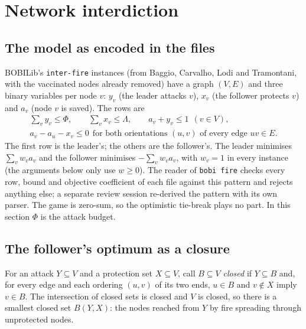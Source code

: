 \section{Network interdiction}\label{app:network}

\subsection{The model as encoded in the files}

BOBILib's \texttt{inter-fire} instances (from Baggio, Carvalho, Lodi and
Tramontani,\cite{baggio2021multilevel} with the vaccinated nodes already removed) have a graph
$(V,E)$ and three binary variables per node $v$: $y_v$ (the leader attacks
$v$), $x_v$ (the follower protects $v$) and $a_v$ (node $v$ is saved). The rows
are
\begin{gather*}
  \sum_vy_v\le\Phi,\qquad
  \sum_vx_v\le\Lambda,\qquad
  a_v+y_v\le 1\ \ (v\in V),\\
  a_v-a_u-x_v\le 0\ \ \text{for both orientations }(u,v)\text{ of every edge }uv\in E.
\end{gather*}
The first row is the leader's; the others are the follower's. The leader
minimises $\sum_vw_va_v$ and the follower minimises $-\sum_vw_va_v$, with
$w_v=1$ in every instance (the arguments below only use $w\ge 0$). The reader of
\texttt{bobi fire} checks every row, bound and objective coefficient of each file against this
pattern and rejects anything else; a separate review session re-derived the
pattern with its own parser. The game is zero-sum, so the optimistic
tie-break plays no part. In this section $\Phi$ is the attack budget.

\subsection{The follower's optimum as a closure}

For an attack $Y\subseteq V$ and a protection set $X\subseteq V$, call
$B\subseteq V$ \emph{closed} if $Y\subseteq B$ and, for every edge and each
ordering $(u,v)$ of its two ends, $u\in B$ and $v\notin X$ imply $v\in B$. The intersection of closed sets is
closed and $V$ is closed, so there is a smallest closed set $B(Y,X)$: the
nodes reached from $Y$ by fire spreading through unprotected nodes.

